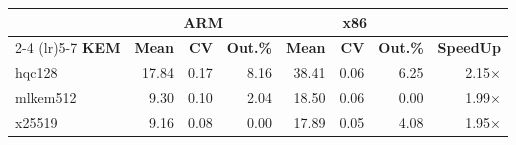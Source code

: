 \begin{table}[!ht]
\begin{tabular}{lrrr|rrr|r}
 \toprule
& \multicolumn{3}{c}{\bfseries ARM} & \multicolumn{3}{c}{\bfseries x86} &\\
\cmidrule(lr){2-4} \cmidrule(lr){5-7}
\textbf{KEM} & \textbf{Mean} & \textbf{CV} & \textbf{Out.\%} & \textbf{Mean} & \textbf{CV} & \textbf{Out.\%} & \textbf{SpeedUp}\\
\midrule
hqc128 & 17.84 & 0.17 & 8.16 & 38.41 & 0.06 & 6.25 & 2.15× \\
mlkem512 & 9.30 & 0.10 & 2.04 & 18.50 & 0.06 & 0.00 & 1.99× \\
x25519 & 9.16 & 0.08 & 0.00 & 17.89 & 0.05 & 4.08 & 1.95× \\
\bottomrule
\end{tabular}
\end{table}
